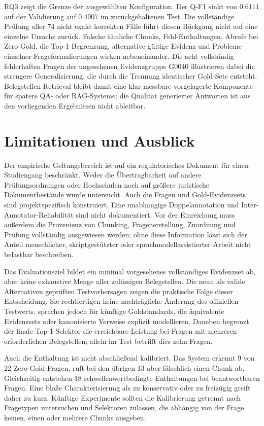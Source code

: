 \documentclass[11pt]{article}
\begin{document}
RQ3 zeigt die Grenze der ausgewählten Konfiguration. Der Q-F1 sinkt von $0.6111$ auf der Validierung auf $0.4907$ im zurückgehaltenen Test. Die vollständige Prüfung aller 74 nicht exakt korrekten Fälle führt diesen Rückgang nicht auf eine einzelne Ursache zurück. Falsche ähnliche Chunks, Fehl-Enthaltungen, Abrufe bei Zero-Gold, die Top-1-Begrenzung, alternative gültige Evidenz und Probleme einzelner Frageformulierungen wirken nebeneinander. Die acht vollständig fehlerhaften Fragen der ungesehenen Evidenzgruppe G0040 illustrieren dabei die strengere Generalisierung, die durch die Trennung identischer Gold-Sets entsteht. Belegstellen-Retrieval bleibt damit eine klar messbare vorgelagerte Komponente für spätere QA- oder RAG-Systeme; die Qualität generierter Antworten ist aus den vorliegenden Ergebnissen nicht ableitbar.


\section{Limitationen und Ausblick}

Der empirische Geltungsbereich ist auf ein regulatorisches Dokument für einen Studiengang beschränkt. Weder die Übertragbarkeit auf andere Prüfungsordnungen oder Hochschulen noch auf größere juristische Dokumentbestände wurde untersucht. Auch die Fragen und Gold-Evidenzsets sind projektspezifisch konstruiert. Eine unabhängige Doppelannotation und Inter-Annotator-Reliabilität sind nicht dokumentiert. Vor der Einreichung muss außerdem die Provenienz von Chunking, Fragenerstellung, Zuordnung und Prüfung vollständig ausgewiesen werden; ohne diese Information lässt sich der Anteil menschlicher, skriptgestützter oder sprachmodellassistierter Arbeit nicht belastbar beschreiben.

Das Evaluationsziel bildet ein minimal vorgesehenes vollständiges Evidenzset ab, aber keine exhaustive Menge aller zulässigen Belegstellen. Die neun als valide Alternativen geprüften Testvorhersagen zeigen die praktische Folge dieser Entscheidung. Sie rechtfertigen keine nachträgliche Änderung des offiziellen Testwerts, sprechen jedoch für künftige Goldstandards, die äquivalente Evidenzsets oder kanonisierte Verweise explizit modellieren. Daneben begrenzt der finale Top-1-Selektor die erreichbare Leistung bei Fragen mit mehreren erforderlichen Belegstellen; allein im Test betrifft dies zehn Fragen.

Auch die Enthaltung ist nicht abschließend kalibriert. Das System erkennt 9 von 22 Zero-Gold-Fragen, ruft bei den übrigen 13 aber fälschlich einen Chunk ab. Gleichzeitig entstehen 18 schwellenwertbedingte Enthaltungen bei beantwortbaren Fragen. Eine bloße Charakterisierung als zu konservativ oder zu freizügig greift daher zu kurz. Künftige Experimente sollten die Kalibrierung getrennt nach Fragetypen untersuchen und Selektoren zulassen, die abhängig von der Frage keinen, einen oder mehrere Chunks ausgeben.
\end{document}
